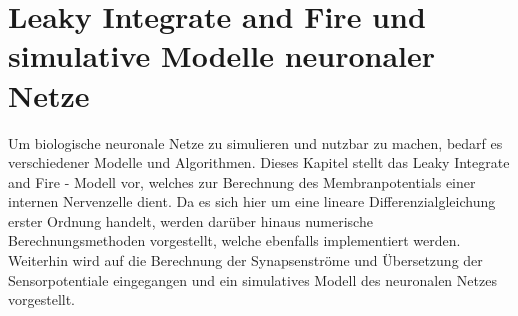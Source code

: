%
\chapter{Leaky Integrate and Fire und simulative Modelle neuronaler Netze}
\label{chap:lif}
%

	Um biologische neuronale Netze zu simulieren und nutzbar zu machen, bedarf es verschiedener Modelle und Algorithmen. Dieses Kapitel stellt das Leaky Integrate and Fire - Modell vor, welches zur Berechnung des Membranpotentials einer internen Nervenzelle dient. Da es sich hier um eine lineare Differenzialgleichung erster Ordnung handelt, werden darüber hinaus numerische Berechnungsmethoden vorgestellt, welche ebenfalls implementiert werden. Weiterhin wird auf die Berechnung der Synapsenströme und Übersetzung der Sensorpotentiale eingegangen und ein simulatives Modell des neuronalen Netzes vorgestellt.

